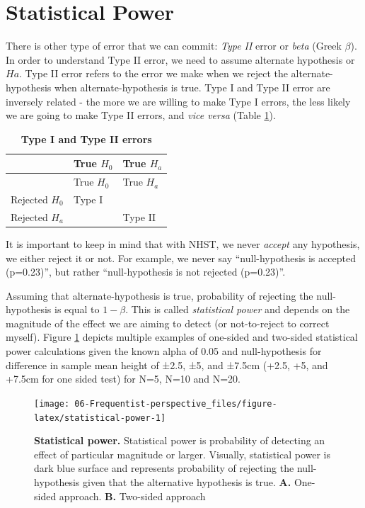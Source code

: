 \documentclass[
]{book}
\begin{document}
\hypertarget{statistical-power}{%
\section{Statistical Power}\label{statistical-power}}

There is other type of error that we can commit: \emph{Type II} error or \emph{beta} (Greek \(\beta\)). In order to understand Type II error, we need to assume alternate hypothesis or \(H{a}\). Type II error refers to the error we make when we reject the alternate-hypothesis when alternate-hypothesis is true. Type I and Type II error are inversely related - the more we are willing to make Type I errors, the less likely we are going to make Type II errors, and \emph{vice versa} (Table \ref{tab:error-types}).

\begin{longtable}[]{@{}lll@{}}
\caption{\label{tab:error-types} \textbf{Type I and Type II errors}}\tabularnewline
\toprule
& True \(H_{0}\) & True \(H_{a}\)\tabularnewline
\midrule
\endfirsthead
\toprule
& True \(H_{0}\) & True \(H_{a}\)\tabularnewline
\midrule
\endhead
Rejected \(H_{0}\) & Type I &\tabularnewline
Rejected \(H_{a}\) & & Type II\tabularnewline
\bottomrule
\end{longtable}

It is important to keep in mind that with NHST, we never \emph{accept} any hypothesis, we either reject it or not. For example, we never say ``null-hypothesis is accepted (p=0.23)'', but rather ``null-hypothesis is not rejected (p=0.23)''.

Assuming that alternate-hypothesis is true, probability of rejecting the null-hypothesis is equal to \(1-\beta\). This is called \emph{statistical power} and depends on the magnitude of the effect we are aiming to detect (or not-to-reject to correct myself). Figure \ref{fig:statistical-power} depicts multiple examples of one-sided and two-sided statistical power calculations given the known alpha of 0.05 and null-hypothesis for difference in sample mean height of ±2.5, ±5, and ±7.5cm (+2.5, +5, and +7.5cm for one sided test) for N=5, N=10 and N=20.

\begin{figure}

{\centering \texttt{[image: 06-Frequentist-perspective\_files/figure-latex/statistical-power-1]} 

}

\caption{\textbf{Statistical power. } Statistical power is probability of detecting an effect of particular magnitude or larger. Visually, statistical power is dark blue surface and represents probability of rejecting the null-hypothesis given that the alternative hypothesis is true. \textbf{A.} One-sided approach. \textbf{B.} Two-sided approach}\label{fig:statistical-power}
\end{figure}
\end{document}
